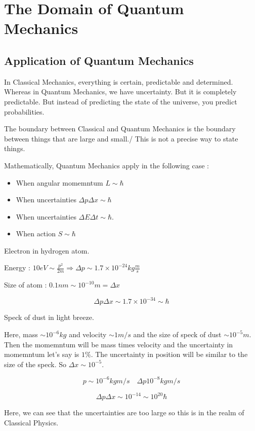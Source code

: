

\chapter{The Domain of Quantum Mechanics}

\bigbreak
\section{Application of Quantum Mechanics}

In Classical Mechanics, everything is certain, predictable and determined.
Whereas in Quantum Mechanics, we have uncertainty. But it is completely predictable.
But instead of predicting the state of the universe, you predict probabilities.

The boundary between Classical and Quantum Mechanics is the boundary between things that are large and small./
This is not a precise way to state things.

Mathematically, Quantum Mechanics apply in the following case : 
\begin{itemize}
	\item When angular momemntum $L \sim \hbar$
	\item When uncertainties $\Delta p \Delta x \sim \hbar$
	\item When uncertainties $\Delta E \Delta t \sim \hbar$.
	\item When action $S \sim \hbar$
\end{itemize}


\begin{exmp}
	Electron in hydrogen atom.
	
	Energy : $10eV \sim \frac{p^2}{2m} \Rightarrow \Delta p \sim 1.7 \times 10^{-24} kg \frac{m}{s}$

	Size of atom : $0.1nm \sim 10^{-10} m = \Delta x$
	
	$$ \Delta p \Delta x \sim 1.7 \times 10^{-34} \sim \hbar $$
\end{exmp}


\begin{exmp}
	Speck of dust in light breeze.

	Here, mass $\sim 10^{-6} kg$ and velocity $\sim 1 m/s$
	and the size of speck of dust $\sim 10^{-5} m$. 
	Then the momemntum will be mass times velocity and the uncertainty in momemntum let's say is $1\%$.
	The uncertainty in position will be similar to the size of the speck.
	So $\Delta x \sim 10^{-5}$.

	$$ p \sim 10^{-6} kg m / s  \quad \Delta p 10^{-8} kg m / s $$ 

	$$ \Delta p \Delta x \sim 10^{-14} \sim 10^{20} \hbar $$

	Here, we can see that the uncertainties are too large so this is in the realm of Classical Physics.

\end{exmp}

